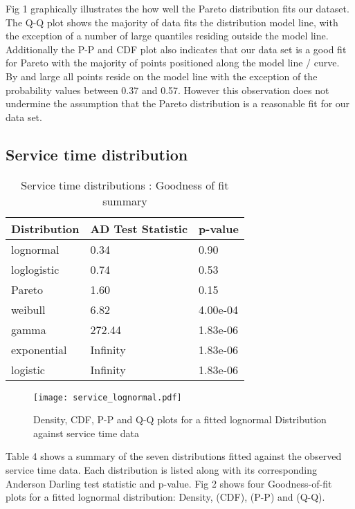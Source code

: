 \documentclass[5p]{elsarticle}
\begin{document}
Fig 1 graphically illustrates the how well the Pareto distribution fits our dataset. The Q-Q plot shows the majority of data fits the distribution model line, with the exception of a number of large quantiles residing outside the model line. Additionally the P-P and CDF plot also indicates that our data set is a good fit for Pareto with the majority of points positioned along the model line / curve. By and large all points reside on the model line with the exception of the probability values between 0.37 and 0.57. However this observation does not undermine the assumption that the Pareto distribution is a reasonable fit for our data set. 

\subsection{Service time distribution}

\begin {table}
\caption {Service time distributions :  Goodness of fit summary} 
\begin{center}
\begin{tabular}{p{2.1cm} |  p{3.1cm} | p{1.3cm}} \hline \bf{Distribution} & \bf{AD Test Statistic} & \bf{p-value}
\\ \hline lognormal & 0.34 & 0.90
\\ loglogistic & 0.74 & 0.53
\\ Pareto & 1.60 & 0.15 
\\ weibull  & 6.82 & 4.00e-04 
\\ gamma & 272.44 & 1.83e-06	
\\ exponential & Infinity & 1.83e-06
\\ logistic & Infinity  & 1.83e-06	
\\ \hline
\end{tabular}
\end{center}
\end{table}

\begin{figure*}[]
\begin{center}
\texttt{[image: service\_lognormal.pdf]} 
\caption{Density, CDF, P-P and Q-Q plots for a fitted lognormal Distribution against service time data}
\end{center}
\label{fig:outagedistribution}
\end{figure*}


Table 4 shows a summary of the seven distributions fitted against the observed service time data. Each distribution is listed along with its corresponding Anderson Darling test statistic and p-value. Fig 2 shows four Goodness-of-fit plots for a fitted lognormal distribution: Density, (CDF), (P-P)  and (Q-Q).  
\end{document}
